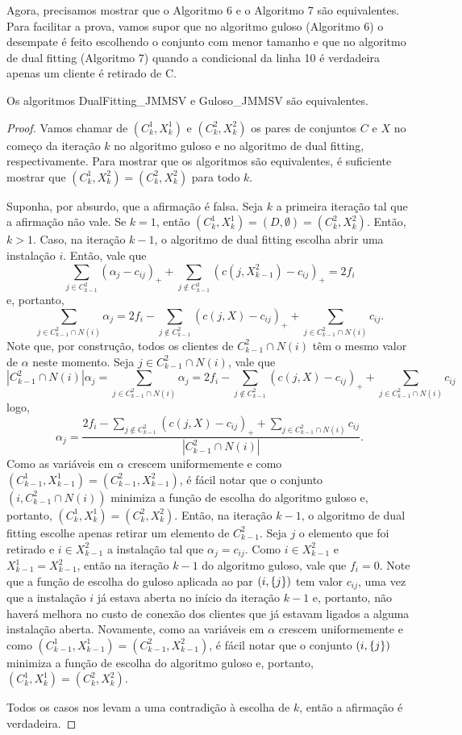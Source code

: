 Agora, precisamos mostrar que o Algoritmo 6 e o Algoritmo 7 são equivalentes. Para facilitar a prova, vamos supor que no algoritmo guloso (Algoritmo 6) o desempate é feito escolhendo o conjunto com menor tamanho e que no algoritmo de dual fitting (Algoritmo 7) quando a condicional da linha 10 é verdadeira apenas um cliente é retirado de C.

\begin{theorem}
Os algoritmos {\sc DualFitting\_JMMSV} e {\sc Guloso\_JMMSV} são equivalentes.
\end{theorem}

\begin{proof}
Vamos chamar de $(C_k^1,X_k^1)$ e $(C_k^2,X_k^2)$ os pares de conjuntos $C$ e $X$ no começo da iteração $k$ no algoritmo guloso e no algoritmo de dual fitting, respectivamente. Para mostrar que os algoritmos são equivalentes, é suficiente mostrar que $(C_k^1,X_k^2) = (C_k^2,X_k^2)$ para todo $k$.

Suponha, por absurdo, que a afirmação é falsa. Seja $k$ a primeira iteração tal que a afirmação não vale. Se $k=1$, então $(C_k^1,X_k^1) = (D,\emptyset) = (C_k^2,X_k^2)$.
Então, $k>1$.
Caso, na iteração $k-1$, o algoritmo de dual fitting escolha abrir uma instalação $i$. Então, vale que 
\[
    \sum_{j \in C_{k-1}^2} (\alpha_j - c_{ij})_+ + \sum_{j \not \in C_{k-1}^2}(c(j,X_{k-1}^2) - c_{ij})_+ = 2f_i
\] 
e, portanto,
\[
    \sum_{j \in C_{k-1}^2 \cap N(i)} \alpha_j = 2f_i - \sum_{j \not \in C_{k-1}^2} (c(j,X)- c_{ij})_+  + \sum_{j \in  C_{k-1}^2 \cap N(i)} c_{ij}. 
\]
Note que, por construção, todos os clientes de  $C_{k-1}^2 \cap N(i)$ têm o mesmo valor de $\alpha$ neste momento. Seja $j \in C_{k-1}^2 \cap N(i)$, vale que
\[
    |C_{k-1}^2 \cap N(i)| \alpha_j = \sum_{j \in C_{k-1}^2 \cap N(i)} \alpha_j = 2f_i - \sum_{j \not \in C_{k-1}^2} (c(j,X)- c_{ij})_+  + \sum_{j \in  C_{k-1}^2 \cap N(i)} c_{ij}
\]
logo, 
\[
    \alpha_j = \frac{ 2f_i - \sum_{j \not \in C_{k-1}^2} (c(j,X)- c_{ij})_+  + \sum_{j \in  C_{k-1}^2 \cap N(i)} c_{ij}}{|C_{k-1}^2 \cap N(i)|}.
\]
Como as variáveis em $\alpha$ crescem uniformemente e como $(C_{k-1}^1,X_{k-1}^1) = (C_{k-1}^2,X_{k-1}^2)$, é fácil notar que o conjunto $(i,C_{k-1}^2 \cap N(i))$ minimiza a função de escolha do algoritmo guloso e, portanto, $(C_{k}^1,X_{k}^1) = (C_{k}^2,X_{k}^2)$. Então, na iteração $k-1$, o algoritmo de dual fitting escolhe apenas retirar um elemento de $C_{k-1}^2$. Seja $j$ o elemento que foi retirado e $i \in X_{k-1}^2$ a instalação tal que $\alpha_j = c_{ij}$. Como $i \in X_{k-1}^2$ e $X_{k-1}^1 = X_{k-1}^2$, então na iteração $k-1$ do algoritmo guloso, vale que $f_i = 0$. Note que a função de escolha do guloso aplicada ao par $(i,\{j\})$ tem valor $c_{ij}$, uma vez que a instalação $i$ já estava aberta no início da iteração $k-1$ e, portanto, não haverá melhora no custo de conexão dos clientes que já estavam ligados a alguma instalação aberta. Novamente, como aa variáveis em $\alpha$ crescem uniformemente e como $(C_{k-1}^1,X_{k-1}^1) = (C_{k-1}^2,X_{k-1}^2)$, é fácil notar que o conjunto $(i,\{j\})$ minimiza a função de escolha do algoritmo guloso e, portanto, $(C_{k}^1,X_{k}^1) = (C_{k}^2,X_{k}^2)$.

Todos os casos nos levam a uma contradição à escolha de $k$, então a afirmação é verdadeira.   
\end{proof}